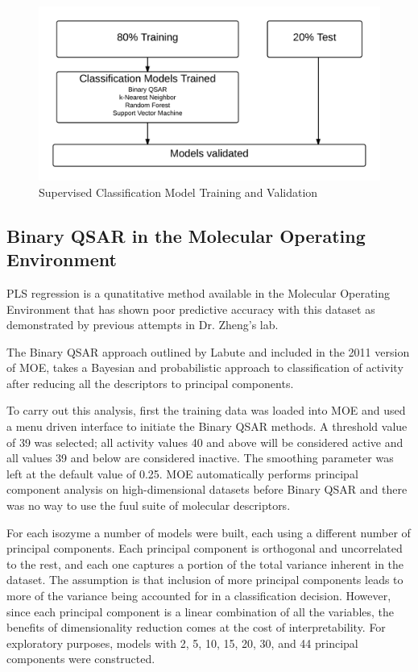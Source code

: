 \begin{figure}[h,t]
  \caption{Supervised Classification Model Training and Validation}
  \centering
   \includegraphics[width=1\textwidth]{../img/Model_validation.png}
\end{figure}

\subsection{Binary QSAR in the Molecular Operating Environment}
PLS regression is a qunatitative method available in the Molecular Operating Environment that has shown poor predictive accuracy with this dataset as demonstrated by previous attempts in Dr. Zheng's lab.

The Binary QSAR approach outlined by Labute \cite{Labute1999} and included in the 2011 version of MOE, takes a Bayesian and probabilistic approach to classification of activity after reducing all the descriptors to principal components.

To carry out this analysis, first the training data was loaded into MOE and used a menu driven interface to initiate the Binary QSAR methods. A threshold value of 39 was selected; all activity values 40 and above will be considered active and all values 39 and below are considered inactive. The smoothing parameter was left at the default value of 0.25. MOE automatically performs principal component analysis on high-dimensional datasets before Binary QSAR and there was no way to use the fuul suite of molecular descriptors.

For each isozyme a number of models were built, each using a different number of principal components.  Each principal component is orthogonal and uncorrelated to the rest, and each one captures a portion of the total variance inherent in the dataset. The assumption is that inclusion of more principal components leads to more of the variance being accounted for in a classification decision. However, since each principal component is a linear combination of all the variables, the benefits of dimensionality reduction comes at the cost of interpretability.  For exploratory purposes, models with 2, 5, 10, 15, 20, 30, and 44 principal components were constructed. 

